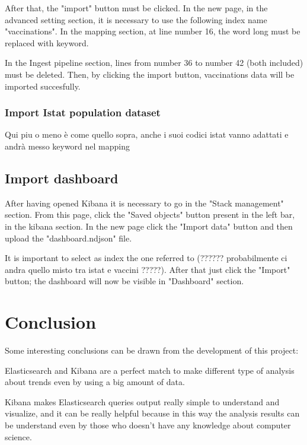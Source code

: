 \documentclass{article}
\begin{document}
After that, the {\selectfont"import"} button must be clicked. In the new page, in the advanced setting section, it is necessary to use the following index name {\selectfont"vaccinations"}. In the mapping section, at line number 16, the word long must be replaced with keyword.

In the Ingest pipeline section, lines from number 36 to number 42 (both included) must be deleted.
Then, by clicking the import button, vaccinations data will be imported succesfully.

\subsubsection{Import Istat population dataset}
Qui piu o meno è come quello sopra, anche i suoi codici istat vanno adattati e andrà messo keyword nel mapping

\subsection{Import dashboard}
After having opened Kibana it is necessary to go in the {\selectfont"Stack management"} section. From this page, click the {\selectfont"Saved objects"} button present in the left bar, in the kibana section. In the new page click the {\selectfont"Import data"} button and then upload the {\selectfont"dashboard.ndjson"} file. 

It is important to select as index the one referred to (?????? probabilmente ci andra quello misto tra istat e vaccini ?????).
After that just click the {\selectfont"Import"} button; the dashboard will now be visible in {\selectfont"Dashboard"} section.

\newpage

\section{Conclusion}

Some interesting conclusions can be drawn from the development of this project:

Elasticsearch and Kibana are a perfect match to make different type of analysis about trends even by using a big amount of data.

Kibana makes Elasticsearch queries output really simple to understand and visualize, and it can be really helpful because in this way the analysis results can be understand even by those who doesn't have any knowledge about computer science.
\end{document}
